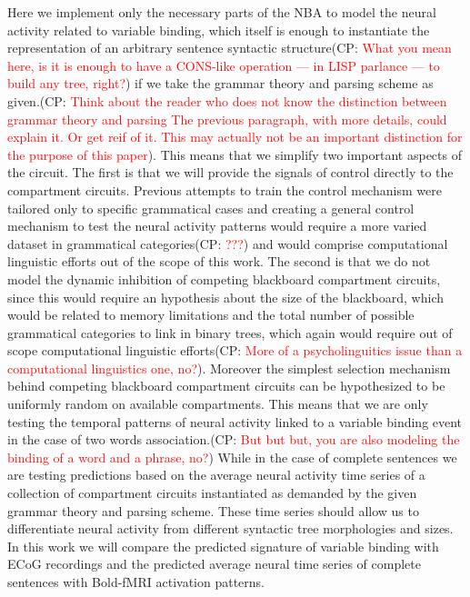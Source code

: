 \documentclass[10pt]{article}
\newcommand{\noteCP}[1]{(CP: \textcolor{red}{#1})}
\begin{document}
Here we implement only the necessary parts of the NBA to model the
neural activity related to variable binding, which itself is enough to
instantiate the representation of an arbitrary sentence syntactic
structure\noteCP{What you mean here, is it is enough to have a
  CONS-like operation --- in LISP parlance --- to build any tree,
  right?} if we take the grammar theory and parsing scheme as
given.\noteCP{Think about the reader who does not know the distinction
  between grammar theory and parsing The previous paragraph, with more
  details, could explain it. Or get reif of it. This may actually not
  be an important distinction for the purpose of this paper}. This
means that we simplify two important aspects of the circuit. The first
is that we will provide the signals of control directly to the
compartment circuits. Previous attempts to train the control
mechanism\cite{van_der_Velde_2010} were tailored only to specific
grammatical cases and creating a general control mechanism to test the
neural activity patterns would require a more varied dataset in
grammatical categories\noteCP{???} and would comprise computational
linguistic efforts out of the scope of this work. The second is that
we do not model the dynamic inhibition of competing blackboard
compartment circuits, since this would require an hypothesis about the
size of the blackboard, which would be related to memory limitations
and the total number of possible grammatical categories to link in
binary trees, which again would require out of scope computational
linguistic efforts\noteCP{More of a psycholinguitics issue than a
  computational linguistics one, no?}. Moreover the simplest selection
mechanism behind competing blackboard compartment circuits can be
hypothesized to be uniformly random on available compartments. This
means that we are only testing the temporal patterns of neural
activity linked to a variable binding event in the case of two words
association.\noteCP{But but but, you are also modeling the binding of
  a word and a phrase, no?} While in the case of complete sentences we
are testing predictions based on the average neural activity time
series of a collection of compartment circuits instantiated as
demanded by the given grammar theory and parsing scheme. These time
series should allow us to differentiate neural activity from different
syntactic tree morphologies and sizes. In this work we will compare
the predicted signature of variable binding with ECoG recordings and
the predicted average neural time series of complete sentences with
Bold-fMRI activation patterns.
\end{document}
